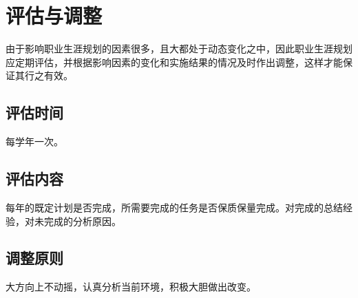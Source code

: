 \documentclass{article}
\begin{document}
\section{评估与调整}
由于影响职业生涯规划的因素很多，且大都处于动态变化之中，因此职业生涯规划应定期评估，并根据影响因素的变化和实施结果的情况及时作出调整，这样才能保证其行之有效。\par 
\subsection{评估时间}
每学年一次。\par
\subsection{评估内容}
每年的既定计划是否完成，所需要完成的任务是否保质保量完成。对完成的总结经验，对未完成的分析原因。\par
\subsection{调整原则}
大方向上不动摇，认真分析当前环境，积极大胆做出改变。\par
\end{document}

